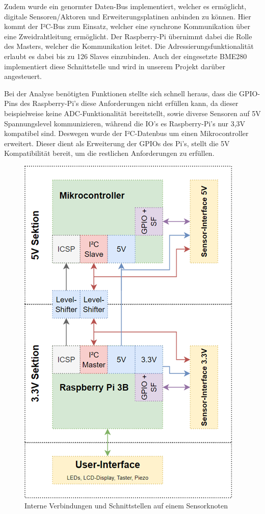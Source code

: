 Zudem wurde ein genormter Daten-Bus implementiert, welcher es ermöglicht, digitale Sensoren/Aktoren und Erweiterungsplatinen anbinden zu können. Hier kommt der I²C-Bus zum Einsatz, welcher eine synchrone Kommunikation über eine Zweidrahtleitung ermöglicht. Der Raspberry-Pi übernimmt dabei die Rolle des Masters, welcher die Kommunikation leitet. Die Adressierungsfunktionalität erlaubt es dabei bis zu 126 Slaves einzubinden. Auch der eingesetzte BME280 implementiert diese Schnittstelle und wird in unserem Projekt darüber angesteuert.

Bei der Analyse benötigten Funktionen stellte sich schnell heraus, dass die GPIO-Pins des Raspberry-Pi’s diese Anforderungen nicht erfüllen kann, da dieser beispielweise keine ADC-Funktionalität bereitstellt, sowie diverse Sensoren auf 5V Spannungslevel kommunizieren, während die IO’s es Raspberry-Pi’s nur 3,3V kompatibel sind. Deswegen wurde der I²C-Datenbus um einen Mikrocontroller erweitert. Dieser dient als Erweiterung der GPIOs des Pi’s, stellt die 5V Kompatibilität bereit, um die restlichen Anforderungen zu erfüllen. 

\begin{figure}[h!]
      \centering
      \includegraphics[scale=0.6]{abbildungen/schaltplan.png}
      \caption{Interne Verbindungen und Schnittstellen auf einem Sensorknoten}
 \end{figure}

